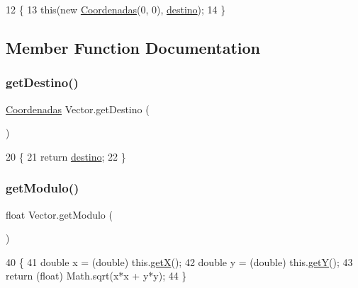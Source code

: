 \begin{DoxyCode}
12                                       \{
13         \textcolor{keyword}{this}(\textcolor{keyword}{new} \mbox{\hyperlink{class_coordenadas}{Coordenadas}}(0, 0), \mbox{\hyperlink{class_vector_af0a20e915c3efce53463578d8e73948e}{destino}});
14     \}
\end{DoxyCode}


\subsection{Member Function Documentation}
\mbox{\label{class_vector_ae6c100e98564be0a47f1c755948eba0a}} 
\subsubsection{\texorpdfstring{get\+Destino()}{getDestino()}}
{\footnotesize\ttfamily \mbox{\hyperlink{class_coordenadas}{Coordenadas}} Vector.\+get\+Destino (\begin{DoxyParamCaption}{ }\end{DoxyParamCaption})\hspace{0.3cm}{\ttfamily [inline]}}


\begin{DoxyCode}
20                                     \{
21         \textcolor{keywordflow}{return} \mbox{\hyperlink{class_vector_af0a20e915c3efce53463578d8e73948e}{destino}};
22     \}
\end{DoxyCode}
\mbox{\label{class_vector_aadab8c5ce31cc4244e8ca06c13bc0b95}} 
\subsubsection{\texorpdfstring{get\+Modulo()}{getModulo()}}
{\footnotesize\ttfamily float Vector.\+get\+Modulo (\begin{DoxyParamCaption}{ }\end{DoxyParamCaption})\hspace{0.3cm}{\ttfamily [inline]}}


\begin{DoxyCode}
40                             \{
41         \textcolor{keywordtype}{double} x = (double) this.\mbox{\hyperlink{class_vector_a3d9de615137bc20dd4f1d6aa8fefa167}{getX}}();
42         \textcolor{keywordtype}{double} y = (double) this.\mbox{\hyperlink{class_vector_ac862d32aed23f8ca72176940f76dc1f9}{getY}}();
43         \textcolor{keywordflow}{return} (\textcolor{keywordtype}{float}) Math.sqrt(x*x + y*y);
44     \}
\end{DoxyCode}
\mbox{\label{class_vector_a27cc1a78b33cfa545f94d24ad0120c1d}} 
